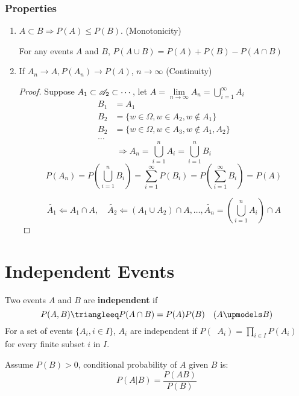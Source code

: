 \subsubsection{Properties}
	\begin{enumerate}[(i.)]
		\item $A\subset B \Rightarrow P(A)\leq P(B)$. (Monotonicity)
		\begin{lemma}
			For any events $A$ and $B$, $P(A\cup B)=P(A) + P(B) - P(A\cap B)$
		\end{lemma}
		\item If $A_n\to A, P(A_n)\to P(A)$, $n\to \infty$ (Continuity)
		\begin{proof}
			Suppose $A_1\subset\mathscr{A}_2\subset\cdots$, let $A=\lim\limits_{n\to\infty}A_n=\mathop{\bigcup}\limits_{i=1}^{\infty}A_i$\\
			\begin{align*}
				B_1 &= A_1 \\
				B_2 &= \{w\in\Omega,w\in A_2,w\notin A_1\}\\
				B_2 &= \{w\in\Omega,w\in A_3,w\notin A_1,A_2\}\\
				\dots &
			\end{align*}
			$$\Rightarrow A_n = \mathop{\bigcup}\limits_{i=1}^{n}A_i = \mathop{\bigcup}\limits_{i=1}^{n}B_i$$
			$$ P(A_n)=P\left(\mathop{\bigcup}\limits_{i=1}^{n}B_i\right)=\sum\limits_{i=1}^{\infty}P(B_i)=P\left(\sum\limits_{i=1}^{\infty}B_i\right)=P(A)$$
			
			$$\tilde{A_1}\Leftarrow A_1\cap A,\quad \tilde{A_2}\Leftarrow(A_1\cup A_2)\cap A, \dots, \tilde{A_n}=\left(\mathop{\bigcup}\limits_{i=1}^{n} A_i\right)\cap A$$
		\end{proof}
	\end{enumerate}

\section{Independent Events}

\begin{definition}[Independence]
	Two events $A$ and $B$ are \textbf{independent} if 
	$$P(A,B)\triangleeq P(A\cap B)=P(A)P(B) \quad (A\upmodels B)$$
	For a set of events $\{A_i,i\in I\}$, $A_i$ are independent if $P(\mathop{\bigcap\limits_{i\in I}}A_i)=\prod\limits_{i\in I} P(A_i)$ for every finite subset $i$ in $I$.
\end{definition}


\begin{definition}
	Assume $P(B)>0$, conditional probability of $A$ given $B$ is:
	$$P(A|B)=\frac{P(AB)}{P(B)}$$
\end{definition}

